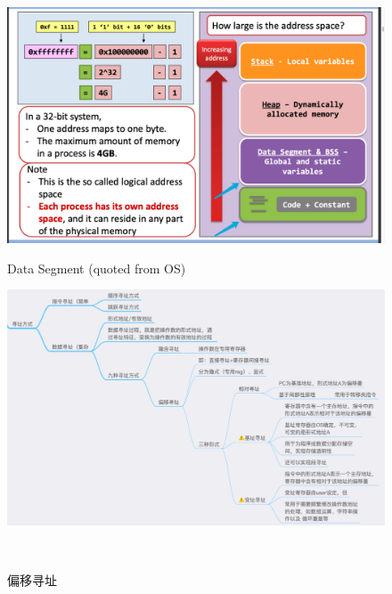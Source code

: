 \documentclass[]{report}
\begin{document}
		\begin{figure}[h]
			\centering
			\begin{minipage}{20em}
				\centering
				\includegraphics[scale = 0.12]{images/Data_Segment_of_Process.png}
				\caption{Data Segment (quoted from OS)}
			\end{minipage}
			\qquad
			\begin{minipage}{20em}
				\centering
				\includegraphics[scale = 0.12]{images/memory_visiting_mindmap.png}
				\caption{\ddag 偏移寻址}
			\end{minipage}
			\\[10pt]
			\begin{minipage}{20em}
				\centering

\end{minipage}
\end{figure}
\end{document}
